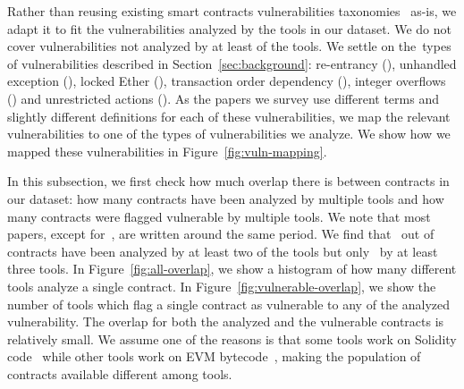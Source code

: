 Rather than reusing existing smart contracts vulnerabilities taxonomies~\cite{Atzei2017} as-is, we adapt it to fit the vulnerabilities analyzed by the tools in our dataset. We do not cover vulnerabilities not analyzed by at least  of the \PapersAnalyzed tools. We settle on the~\VulnTypes types of vulnerabilities described in Section~\ref{sec:background}: re-entrancy (\vre), unhandled exception (\vue), locked Ether (\vle), transaction order dependency (\vto), integer overflows (\vio) and unrestricted actions (\vua). As the papers we survey use different terms and slightly different definitions for each of these vulnerabilities, we map the relevant vulnerabilities to one of the \VulnTypes types of vulnerabilities we analyze. We show how we mapped these vulnerabilities in Figure~\ref{fig:vuln-mapping}.


In this subsection, we first check how much overlap there is between contracts in our dataset: how many contracts have been analyzed by multiple tools and how many contracts were flagged vulnerable by multiple tools.
We note that most papers, except for~\cite{Luu2016a}, are written around the same period. We find that~ out of~ contracts have been analyzed by at least two of the tools but only~ by at least three tools.
In Figure~\ref{fig:all-overlap}, we show a histogram of how many different tools analyze a single contract. In Figure~\ref{fig:vulnerable-overlap}, we show the number of tools which flag a single contract as vulnerable to any of the analyzed vulnerability. The overlap for both the analyzed and the vulnerable contracts is relatively small. We assume one of the reasons is that some tools work on Solidity code~\cite{DBLP:conf/ndss/KalraGDS18} while other tools work on EVM bytecode~\cite{Tsankov2018,Luu2016a}, making the population of contracts available different among tools.

